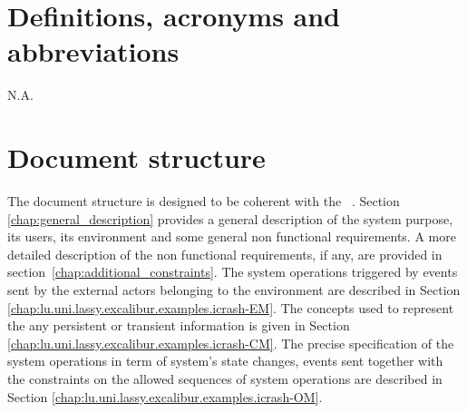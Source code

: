  
\section{Definitions, acronyms and abbreviations}

N.A.

\section{Document structure} 
The document structure is designed to be coherent with the
\msrmessirmeth~\cite{messirbook}. Section \ref{chap:general_description} provides a general
description of the system purpose, its users, its environment and some general
non functional requirements. A more detailed description of the non functional
requirements, if any, are provided in section~\ref{chap:additional_constraints}.
The \glspl{system operation} triggered by events sent by the external
\glspl{actor}  belonging to the environment are described in Section \ref{chap:lu.uni.lassy.excalibur.examples.icrash-EM}.
The \msricrash concepts used to represent the any persistent or transient
information is given in Section \ref{chap:lu.uni.lassy.excalibur.examples.icrash-CM}. The precise specification of the system operations in term of system's state changes, events sent together with the constraints on the allowed sequences of system operations are described in Section
\ref{chap:lu.uni.lassy.excalibur.examples.icrash-OM}.
